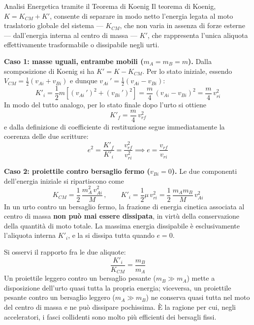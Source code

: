 \begin{esempio}{Analisi Energetica tramite il Teorema di Koenig}
Il teorema di Koenig, $K = K_{CM} + K'$, consente di separare in modo netto l'energia legata al moto traslatorio globale del sistema --- $K_{CM}$, che non varia in assenza di forze esterne --- dall'energia interna al centro di massa --- $K'$, che rappresenta l'unica aliquota effettivamente trasformabile o dissipabile negli urti.

\medskip
\textbf{Caso 1: masse uguali, entrambe mobili ($m_A = m_B = m$).}
Dalla scomposizione di Koenig si ha $K' = K - K_{CM}$. Per lo stato iniziale, essendo $V_{CM} = \frac{1}{2}(v_{Ai} + v_{Bi})$ e dunque $v_{Ai}\,' = \frac{1}{2}(v_{Ai} - v_{Bi})$:
\begin{equation}
    K'_i = \frac{1}{2}m \left[(v_{Ai}\,')^2 + (v_{Bi}\,')^2\right]
         = \frac{m}{4}\,(v_{Ai} - v_{Bi})^2 = \frac{m}{4}\,v_{ri}^2
\end{equation}
In modo del tutto analogo, per lo stato finale dopo l'urto si ottiene
\begin{equation}
    K'_f = \frac{m}{4}\,v_{rf}^2
\end{equation}
e dalla definizione di coefficiente di restituzione segue immediatamente la coerenza delle due scritture:
\begin{equation*}
    e^2 = \frac{K'_f}{K'_i} = \frac{v_{rf}^2}{v_{ri}^2}
    \implies e = \frac{v_{rf}}{v_{ri}}
\end{equation*}

\medskip
\textbf{Caso 2: proiettile contro bersaglio fermo ($v_{Bi} = 0$).}
Le due componenti dell'energia iniziale si ripartiscono come
\begin{equation}
    K_{CM} = \frac{1}{2}\,\frac{m_A^2 \,v_{Ai}^2}{M}
    \, , \qquad
    K'_i = \frac{1}{2}\mu \, v_{ri}^2 = \frac{1}{2}\,\frac{m_A m_B}{M}\,v_{Ai}^2
\end{equation}
In un urto contro un bersaglio fermo, la frazione di energia cinetica associata al centro di massa \textbf{non può mai essere dissipata}, in virtù della conservazione della quantità di moto totale. La massima energia dissipabile è esclusivamente l'aliquota interna $K'_i$, e la si dissipa tutta quando $e = 0$.

\medskip
Si osservi il rapporto fra le due aliquote:
\begin{equation*}
    \frac{K'_i}{K_{CM}} = \frac{m_B}{m_A}
\end{equation*}
Un proiettile leggero contro un bersaglio pesante ($m_B \gg m_A$) mette a disposizione dell'urto quasi tutta la propria energia; viceversa, un proiettile pesante contro un bersaglio leggero ($m_A \gg m_B$) ne conserva quasi tutta nel moto del centro di massa e ne può dissipare pochissima. È la ragione per cui, negli acceleratori, i fasci collidenti sono molto più efficienti dei bersagli fissi.
\end{esempio}
